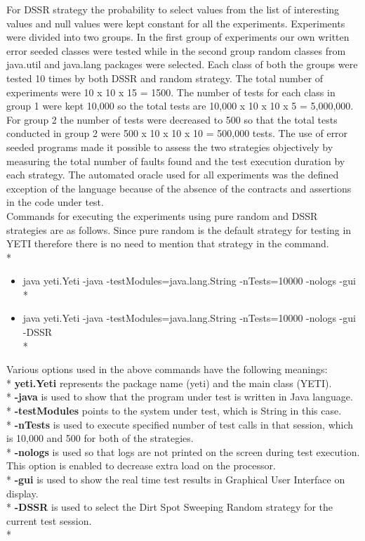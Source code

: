 \documentclass[10pt, conference, compsocconf]{IEEEtran}
\begin{document}
For DSSR strategy the probability to select values from the list of interesting values and null values were kept constant for all the experiments. Experiments were divided into two groups. In the first group of experiments our own written error seeded classes were tested while in the second group random classes from java.util and java.lang packages were selected. Each class of both the groups were tested 10 times by both DSSR and random strategy. The total number of experiments were 10 x 10 x 15 = 1500. The number of tests for each class in group 1 were kept 10,000 so the total tests are 10,000 x 10 x 10 x 5 = 5,000,000.  For group 2 the number of tests were decreased to 500 so that the total tests conducted in group 2 were 500 x 10 x 10 x 10 = 500,000 tests. The use of error seeded programs made it possible to assess the two strategies objectively by measuring the total number of faults found and the test execution duration by each strategy. The automated oracle used for all experiments was the defined exception of the language because of the absence of the contracts and assertions in the code under test.\\

Commands for executing the experiments using pure random and DSSR strategies are as follows. Since pure random is the default strategy for testing in YETI therefore there is no need to mention that strategy in the command.\\*

\begin{itemize}

\item java yeti.Yeti -java -testModules=java.lang.String -nTests=10000 -nologs -gui\\*

\item java yeti.Yeti -java -testModules=java.lang.String -nTests=10000 -nologs -gui -DSSR\\*

\end{itemize}

Various options used in the above commands have the following meanings:\\*
\textbf{yeti.Yeti} represents the package name (yeti) and the main class (YETI).\\*
\textbf{-java} is used to show that the program under test is written in Java language.\\*
\textbf{-testModules} points to the system under test, which is String in this case.\\*
\textbf{-nTests} is used to execute specified number of test calls in that session, which is 10,000 and 500 for both of the strategies.\\*
\textbf{-nologs} is used so that logs are not printed on the screen during test execution. This option is enabled to decrease extra load on the processor.\\*
\textbf{-gui} is used to show the real time test results in Graphical User Interface on display.\\*
\textbf{-DSSR} is used to select the Dirt Spot Sweeping Random strategy for the current test session.\\*
\end{document}
